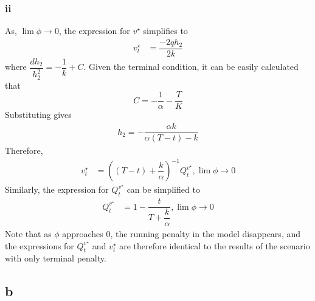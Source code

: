 \documentclass{article}
\begin{document}
\subsubsection*{ii}
As, $\lim \phi \to 0$, the expression for $v^{\star}$ simplifies to\\
\begin{equation*}
    \begin{split}
       v_{t}^{\star} &= \dfrac{-2q h_{2}}{2k}
    \end{split}
\end{equation*}
where $\dfrac{dh_{2}}{h_{2}^{2}} = -\dfrac{1}{k} +C $.
Given the terminal condition, it can be easily calculated that 
\begin{equation*}
    C = -\dfrac{1}{\alpha} -\dfrac{T}{K}
\end{equation*}
Substituting gives 
\begin{equation*}
    \begin{split}
       h_{2} = -\dfrac{\alpha k}{\alpha(T - t)-k} 
    \end{split}
\end{equation*}
Therefore, 
\begin{equation*}
    \begin{split}
       v_{t}^{\star} &= ((T-t) +\dfrac{k}{\alpha})^{-1} Q_{t}^{v^{\star}}, \lim \phi\to 0
    \end{split}
\end{equation*}
Similarly, the expression for $Q_{t}^{v^{\star}}$ can be simplified to 
\begin{equation*}
    \begin{split}
       Q_{t}^{v^{\star}} &= 1 - \dfrac{t}{T + \dfrac{k}{\alpha}} , \lim \phi\to 0
    \end{split}
\end{equation*}
Note that as $\phi$ approaches $0$, the running penalty in the model disappears, and the expressions for $Q_{t}^{v^{\star}}$ and $v_{t}^{\star}$ are therefore identical to the results of the scenario with only terminal penalty.

\subsection*{b}
\end{document}

